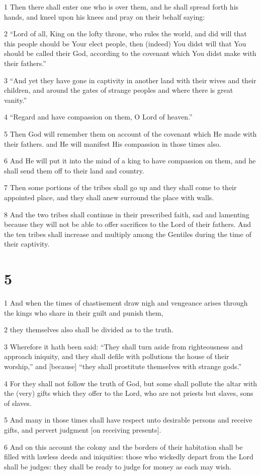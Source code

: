 \par 1 Then there shall enter one who is over them, and he shall spread forth his hands, and kneel upon his knees and pray on their behalf saying:
\par 2 “Lord of all, King on the lofty throne, who rules the world, and did will that this people should be Your elect people, then (indeed) You didst will that You should be called their God, according to the covenant which You didst make with their fathers.”
\par 3 “And yet they have gone in captivity in another land with their wives and their children, and around the gates of strange peoples and where there is great vanity.”
\par 4 “Regard and have compassion on them, O Lord of heaven.”
\par 5 Then God will remember them on account of the covenant which He made with their fathers. and He will manifest His compassion in those times also.
\par 6 And He will put it into the mind of a king to have compassion on them, and he shall send them off to their land and country.
\par 7 Then some portions of the tribes shall go up and they shall come to their appointed place, and they shall anew surround the place with walls.
\par 8 And the two tribes shall continue in their prescribed faith, sad and lamenting because they will not be able to offer sacrifices to the Lord of their fathers. And the ten tribes shall increase and multiply among the Gentiles during the time of their captivity.

\chapter{5}

\par 1 And when the times of chastisement draw nigh and vengeance arises through the kings who share in their guilt and punish them,
\par 2 they themselves also shall be divided as to the truth.
\par 3 Wherefore it hath been said: “They shall turn aside from righteousness and approach iniquity, and they shall defile with pollutions the house of their worship,” and [because] “they shall prostitute themselves with strange gods.”
\par 4 For they shall not follow the truth of God, but some shall pollute the altar with the (very) gifts which they offer to the Lord, who are not priests but slaves, sons of slaves.
\par 5 And many in those times shall have respect unto desirable persons and receive gifts, and pervert judgment [on receiving presents].
\par 6 And on this account the colony and the borders of their habitation shall be filled with lawless deeds and iniquities: those who wickedly depart from the Lord shall be judges: they shall be ready to judge for money as each may wish.

